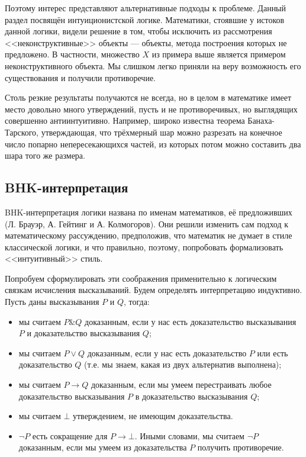 Поэтому интерес представляют альтернативные подходы к проблеме. Данный раздел посвящён 
интуиционистской логике. Математики, стоявшие у истоков данной логики, видели решение в том,
чтобы исключить из рассмотрения <<неконструктивные>> объекты --- объекты, метода построения
которых не предложено. В частности, множество $X$ из примера выше является примером 
неконструктивного объекта. Мы слишком легко приняли на веру возможность его существования и
получили противоречие.

Столь резкие результаты получаются не всегда, но в целом в математике имеет место 
довольно много утверждений, пусть и не противоречивых, но выглядящих совершенно антиинтуитивно.
Например, широко известна теорема Банаха-Тарского, утверждающая, что трёхмерный шар можно 
разрезать на конечное число попарно непересекающихся частей, из которых потом можно составить
два шара того же размера.

\subsection*{BHK-интерпретация}

BHK-интерпретация логики названа по именам математиков, её предложивших 
(Л. Брауэр, А. Гейтинг и А. Колмогоров). 
Они решили изменить сам подход к математическому рассуждению, предположив,
что математик не думает в стиле классической логики, и что 
правильно, поэтому, попробовать формализовать <<интуитивный>> стиль.

Попробуем сформулировать эти соображения применительно к 
логическим связкам исчисления высказываний. Будем определять интерпретацию индуктивно. 
Пусть даны высказывания $P$ и $Q$, тогда:

\begin{itemize}
\item мы считаем $P \& Q$ доказанным, если у нас есть доказательство 
высказывания $P$ и доказательство высказывания $Q$;
\item мы считаем $P \vee Q$ доказанным, если у нас есть доказательство $P$ или 
есть доказательство $Q$ (т.е. мы знаем, какая из двух альтернатив выполнена);
\item мы считаем $P \rightarrow Q$ доказанным, если мы умеем перестраивать любое 
доказательство высказывания $P$ в доказательство высказывания $Q$;
\item мы считаем $\bot$ утверждением, не имеющим доказательства.
\item $\neg P$ есть сокращение для $P \rightarrow \bot$. Иными словами, мы считаем 
$\neg P$ доказанным, если мы умеем из доказательства $P$ получить противоречие.
\end{itemize}

